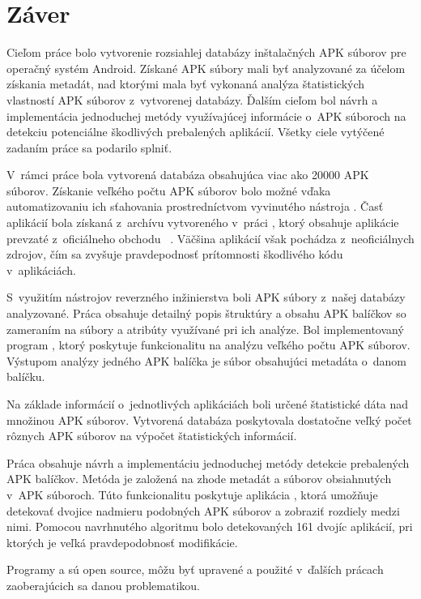 \chapter{Záver}
Cieľom práce bolo vytvorenie rozsiahlej databázy inštalačných APK súborov pre operačný systém Android. Získané APK súbory mali byť analyzované za účelom získania metadát, nad ktorými mala byť vykonaná analýza štatistických vlastností APK súborov z~vytvorenej databázy. Ďalším cieľom bol návrh a implementácia jednoduchej metódy využívajúcej informácie o~APK súboroch na detekciu potenciálne škodlivých prebalených aplikácií. Všetky ciele vytýčené zadaním práce sa podarilo splniť.

V~rámci práce bola vytvorená databáza obsahujúca viac ako 20000 APK súborov. Získanie veľkého počtu APK súborov bolo možné vďaka automatizovaniu ich sťahovania prostredníctvom vyvinutého nástroja . Časť aplikácií bola získaná z~archívu vytvoreného v~práci , ktorý obsahuje aplikácie prevzaté z~oficiálneho obchodu ~\cite{Viennot2014}. Väčšina aplikácií však pochádza z~neoficiálnych zdrojov, čím sa zvyšuje pravdepodnosť prítomnosti škodlivého kódu v~aplikáciách. 

S~využitím nástrojov reverzného inžinierstva boli APK súbory z~našej databázy analyzované. Práca obsahuje detailný popis štruktúry a obsahu APK balíčkov so zameraním na súbory a atribúty využívané pri ich analýze. Bol implementovaný program , ktorý poskytuje funkcionalitu na analýzu veľkého počtu APK súborov. Výstupom analýzy jedného APK balíčka je súbor obsahujúci metadáta o~danom balíčku.

Na základe informácií o~jednotlivých aplikáciách boli určené štatistické dáta nad množinou APK súborov. Vytvorená databáza poskytovala dostatočne veľký počet rôznych APK súborov na výpočet štatistických informácií.

Práca obsahuje návrh a implementáciu jednoduchej metódy detekcie prebalených APK balíčkov. Metóda je založená na zhode metadát a súborov obsiahnutých v~APK súboroch. Túto funkcionalitu poskytuje aplikácia , ktorá umožňuje detekovať dvojice nadmieru podobných APK súborov a zobraziť rozdiely medzi nimi. Pomocou navrhnutého algoritmu bolo detekovaných 161 dvojíc aplikácií, pri ktorých je veľká pravdepodobnosť modifikácie.

Programy  a  sú open source, môžu byť upravené a použité v~ďalších prácach zaoberajúcich sa danou problematikou. 
